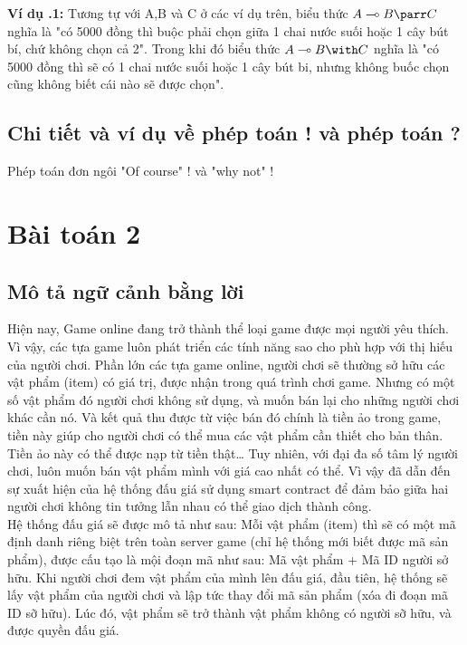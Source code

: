 \documentclass[a4paper]{article}
\begin{document}
\textbf{Ví dụ \thesubsection.1:} Tương tự với A,B và C ở các ví dụ trên, biểu thức $A \multimap B \parr C$ nghĩa là "có 5000 đồng thì buộc phải chọn giữa 1 chai nước suối hoặc 1 cây bút bí, chứ không chọn cả 2". Trong khi đó biểu thức $A \multimap B \with C$ nghĩa là "có 5000 đồng thì sẽ có 1 chai nước suối hoặc 1 cây bút bi, nhưng không buốc chọn cũng không biết cái nào sẽ được chọn".

\subsection{Chi tiết và ví dụ về phép toán ! và phép toán ?}
Phép toán đơn ngôi "Of course" ! và "why not" !

\section{Bài toán 2}
\subsection{Mô tả ngữ cảnh bằng lời}

Hiện nay, Game online đang trở thành thể loại game được mọi người yêu thích. Vì vậy, các tựa game luôn phát triển các tính năng sao cho phù hợp với thị hiếu của người chơi. Phần lớn các tựa game online, người chơi sẽ thường sở hữu các vật phẩm (item) có giá trị, được nhận trong quá trình chơi game. Nhưng có một số vật phẩm đó người chơi không sử dụng, và muốn bán lại cho những người chơi khác cần nó. Và kết quả thu được từ việc bán đó chính là tiền ảo trong game, tiền này giúp cho người chơi có thể mua các vật phẩm cần thiết cho bản thân. Tiền ảo này có thể được nạp từ tiền thật… Tuy nhiên, với đại đa số tâm lý người chơi, luôn muốn bán vật phẩm mình với giá cao nhất có thể. Vì vậy đã dẫn đến sự xuất hiện của hệ thống đấu giá sử dụng smart contract để đảm bảo giữa hai người chơi không tin tưởng lẫn nhau có thể giao dịch thành công.\\

	Hệ thống đấu giá sẽ được mô tả như sau: Mỗi vật phẩm (item) thì sẽ có một mã định danh riêng biệt trên toàn server game (chỉ hệ thống mới biết được mã sản phẩm), được cấu tạo là mội đoạn mã như sau: Mã vật phẩm +  Mã ID người sở hữu. Khi người chơi đem vật phẩm của mình lên đấu giá, đầu tiên, hệ thống sẽ lấy vật phẩm của người chơi và lập tức thay đổi mã sản phẩm (xóa đi đoạn mã ID sỡ hữu). Lúc đó, vật phẩm sẽ trở thành vật phẩm không có người sỡ hữu, và được quyền đấu giá.  \\
	
\end{document}
